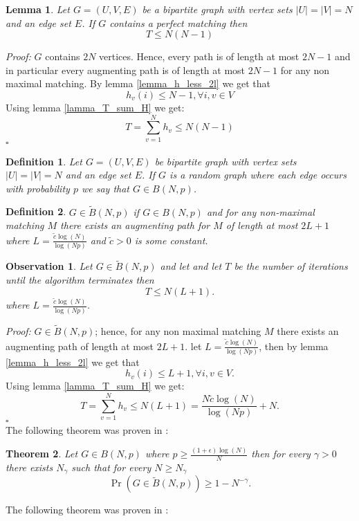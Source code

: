 \documentclass[11pt,onecolumn]{article}
\newcounter{theorem}
\newtheorem{lemma}[theorem]{Lemma}
\newcounter{definition}
\newtheorem{definition}{Definition}
\newcommand{\beq}{\begin{equation}}
\newcommand{\eeq}{\end{equation}}
\newenvironment{proof}{\textit{Proof:}}{\hfill$\square$\\}
\newtheorem{observation}{Observation}
\newtheorem{theorem}{Theorem}
\begin{document}
\begin{lemma}
 \label{lemma_worst_case}Let $G=(U,V,E)$ be a bipartite graph with vertex sets $|U|=|V|=N$ and an edge set $E$. If $G$ contains a perfect matching then
\beq
T\leq N(N-1)
\eeq
\end{lemma}
\begin{proof}
$G$ contains $2N$ vertices. Hence, every path is of length at most $2N-1$ and in particular every augmenting path is of length at most $2N-1$ for any non maximal matching.
By lemma \ref{lemma_h_less_2l} we get that
\beq
h_v(i)\leq N-1 ,\forall i,v\in V
\eeq
Using lemma \ref{lamma_T_sum_H} we get:
\beq
T=\sum_{v=1}^N h_v\leq N(N-1)
\eeq
\end{proof}
\begin{definition}   Let $G=(U,V,E)$ be bipartite graph with vertex sets $|U|=|V|=N$ and an edge set $E$. If $G$ is a random graph where each edge occurs with probability $p$ we say that $G\in B(N,p)$.
\end{definition}
\begin{definition}
$G\in\tilde{B}(N,p)$ if $G\in B(N,p)$ and for any non-maximal matching $M$ there exists an augmenting path for $M$ of length at most $2L+1$ where $L=\frac{\tilde {c}\log(N)}{\log(Np)}$ and $\tilde {c}>0$ is some constant.
\end{definition}
\begin{observation} \label{lemma_log_path_alg} Let $G\in \tilde{B}(N,p)$ and let and let $T$ be the number of iterations until the algorithm terminates then
\beq
T\leq N(L+1).
\eeq
where $L=\frac{\tilde {c}\log(N)}{\log(Np)}$.
\end{observation}
\begin{proof}
$G\in \tilde{B}(N,p)$; hence, for any non maximal matching $M$ there exists an augmenting path of length at most $2L+1$.
let $L=\frac{\tilde {c}\log(N)}{\log(Np)}$, then
by lemma \ref{lemma_h_less_2l} we get that
\beq
h_v(i)\leq L+1 ,\forall i , v\in V.
\eeq
Using lemma \ref{lamma_T_sum_H} we get:
\beq
T=\sum_{v=1}^N h_v\leq N(L+1)=\frac{N\tilde {c}\log(N)}{\log(Np)}+N.
\eeq
\end{proof}
The following theorem was proven in \cite{motwani1994average}:
\begin{theorem}\label{lemma_prob_bnp} Let $G\in B(N,p)$ where $p\geq\frac{(1+\epsilon)\log(N)}{N}$ then for every $\gamma>0$ there exists $N_{\gamma}$ such that for every $N\geq N_{\gamma}$
\beq
\Pr(G\in \tilde{B}(N,p))\geq 1-N^{-\gamma}.
\eeq
\end{theorem}
The following theorem was proven in \cite{erdHos1966existence}:
\end{document}
